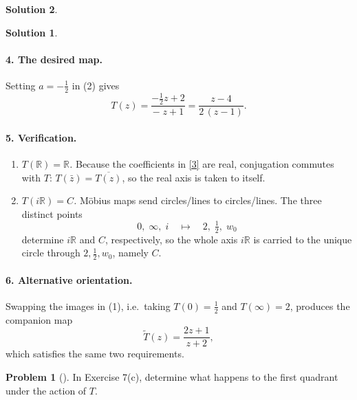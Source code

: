 \documentclass[12pt]{article}
\theoremstyle{definition} %
\newtheorem{solution}{Solution}
\newtheorem{problem}{Problem}
\theoremstyle{plain} %
\begin{document}
\begin{solution}
\begin{solution}
      \paragraph{4.  The desired map.}
      Setting $a=-\tfrac12$ in (2) gives
      \[
         T(z)=\frac{-\tfrac12 z+2}{-\;z+1}
              =\frac{z-4}{2\,(z-1)}.
         \tag{3}
      \]
      
      \paragraph{5.  Verification.}
      \begin{enumerate}[label=\textbf{\alph*)}]
         \item \emph{$T(\mathbb{R})=\mathbb{R}$.}  
               Because the coefficients in \eqref{3} are real, conjugation commutes with $T$:
               $T(\bar z)=\overline{T(z)}$, so the real axis is taken to itself.
         \item \emph{$T(i\mathbb{R})=C$.}  
               Möbius maps send circles/lines to circles/lines.  
               The three distinct points
               \[
                  0,\;\infty,\;i
                  \quad\mapsto\quad
                  2,\;\tfrac12,\;w_0
               \]
               determine $i\mathbb{R}$ and $C$, respectively, so the whole axis $i\mathbb{R}$ is carried to the unique circle through $2,\tfrac12,w_0$, namely $C$.
      \end{enumerate}
      
      \paragraph{6.  Alternative orientation.}
      Swapping the images in (1), i.e.\ taking $T(0)=\tfrac12$ and $T(\infty)=2$, produces the companion map
      \[
         \widetilde{T}(z)=\frac{2z+1}{z+2},
      \]
      which satisfies the same two requirements.
      \end{solution}
\end{solution}
\begin{problem}[]
In Exercise 7(c), determine what happens to the first quadrant under the action of $T$. 
\end{problem}
\end{document}
